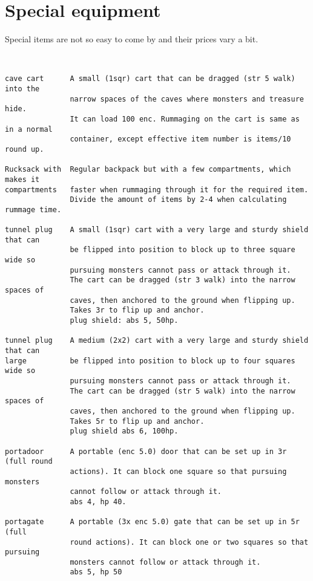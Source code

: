 

\section*{Special equipment}

Special items are not so easy to come by and their prices vary a bit.

\

\begin{verbatim}
cave cart      A small (1sqr) cart that can be dragged (str 5 walk) into the
               narrow spaces of the caves where monsters and treasure hide.
               It can load 100 enc. Rummaging on the cart is same as in a normal
               container, except effective item number is items/10 round up.

Rucksack with  Regular backpack but with a few compartments, which makes it
compartments   faster when rummaging through it for the required item.
               Divide the amount of items by 2-4 when calculating rummage time.

tunnel plug    A small (1sqr) cart with a very large and sturdy shield that can
               be flipped into position to block up to three square wide so
               pursuing monsters cannot pass or attack through it.
               The cart can be dragged (str 3 walk) into the narrow spaces of
               caves, then anchored to the ground when flipping up.
               Takes 3r to flip up and anchor.
               plug shield: abs 5, 50hp.

tunnel plug    A medium (2x2) cart with a very large and sturdy shield that can
large          be flipped into position to block up to four squares wide so
               pursuing monsters cannot pass or attack through it.
               The cart can be dragged (str 5 walk) into the narrow spaces of
               caves, then anchored to the ground when flipping up.
               Takes 5r to flip up and anchor.
               plug shield abs 6, 100hp.

portadoor      A portable (enc 5.0) door that can be set up in 3r (full round
               actions). It can block one square so that pursuing monsters
               cannot follow or attack through it.
               abs 4, hp 40.

portagate      A portable (3x enc 5.0) gate that can be set up in 5r (full
               round actions). It can block one or two squares so that pursuing
               monsters cannot follow or attack through it.
               abs 5, hp 50


\end{verbatim}
